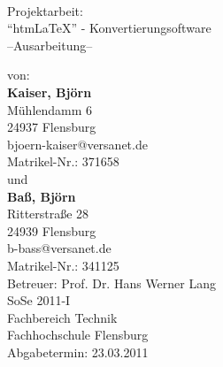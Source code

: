 \documentclass[	a4paper,		%
		titlepage, 		%
		fontsize=12pt		%
		]{scrartcl} 		%
\begin{document}
\begin{titlepage}
\centering
\resizebox*{.25\textheight}{!}{} \\
\vspace{1cm}
\Large Projektarbeit: \\ ``htm\LaTeX'' - Konvertierungsoftware\\ --Ausarbeitung--
\vspace{2cm}
\vfill
\begin{flushleft}			%
\noindent
\normalsize
von:\\ \textbf{Kaiser, Björn} \\Mühlendamm 6\\24937 Flensburg\\bjoern-kaiser@versanet.de\\ Matrikel-Nr.: 371658\\ \vspace{.5cm}
und\\ \vspace{.5cm}
\textbf{Baß, Björn} \\Ritterstraße 28\\24939 Flensburg\\b-bass@versanet.de\\ Matrikel-Nr.: 341125\\ \vspace{1cm}
\large Betreuer: Prof. Dr. Hans Werner Lang\\
SoSe 2011-I\\
Fachbereich Technik\\
Fachhochschule Flensburg\\\vspace{.5em}
Abgabetermin: 23.03.2011
\end{flushleft}
\end{titlepage}

\newpage				%
\tableofcontents			%
\thispagestyle{empty}			%
\newpage				%
 \listoffigures				%
 \lstlistoflistings			%
\newpage				%
\end{document}
